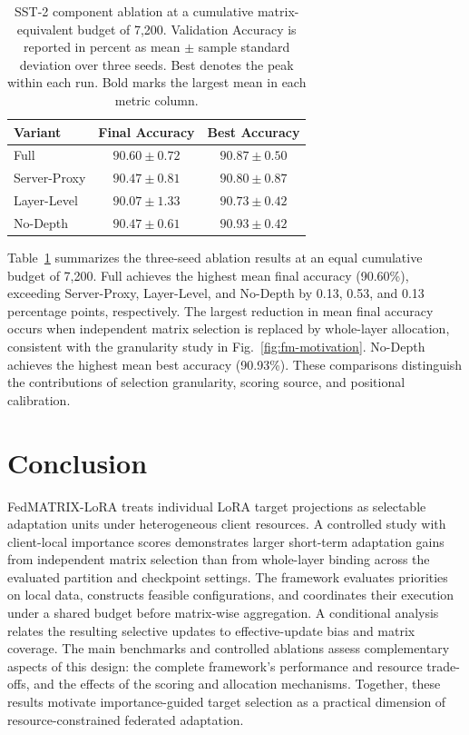 \documentclass[10pt,conference,letterpaper]{IEEEtran}
\begin{document}
\begin{table}[t]
\centering
\caption{SST-2 component ablation at a cumulative matrix-equivalent budget of 7,200. Validation Accuracy is reported in percent as mean $\pm$ sample standard deviation over three seeds. Best denotes the peak within each run. Bold marks the largest mean in each metric column.}
\label{tab:fm-ablations}
\small
\setlength{\tabcolsep}{4pt}
\begin{tabular}{@{}lcc@{}}
\toprule
Variant & Final Accuracy & Best Accuracy \\
\midrule
Full & $\mathbf{90.60}\pm0.72$ & $90.87\pm0.50$ \\
Server-Proxy & $90.47\pm0.81$ & $90.80\pm0.87$ \\
Layer-Level & $90.07\pm1.33$ & $90.73\pm0.42$ \\
No-Depth & $90.47\pm0.61$ & $\mathbf{90.93}\pm0.42$ \\
\bottomrule
\end{tabular}
\end{table}

Table~\ref{tab:fm-ablations} summarizes the three-seed ablation results at an equal cumulative budget of 7,200. Full achieves the highest mean final accuracy (90.60\%), exceeding Server-Proxy, Layer-Level, and No-Depth by 0.13, 0.53, and 0.13 percentage points, respectively. The largest reduction in mean final accuracy occurs when independent matrix selection is replaced by whole-layer allocation, consistent with the granularity study in Fig.~\ref{fig:fm-motivation}. No-Depth achieves the highest mean best accuracy (90.93\%). These comparisons distinguish the contributions of selection granularity, scoring source, and positional calibration.

\FloatBarrier
\section{Conclusion}\label{Sec.conclusion}
FedMATRIX-LoRA treats individual LoRA target projections as selectable adaptation units under heterogeneous client resources. A controlled study with client-local importance scores demonstrates larger short-term adaptation gains from independent matrix selection than from whole-layer binding across the evaluated partition and checkpoint settings. The framework evaluates priorities on local data, constructs feasible configurations, and coordinates their execution under a shared budget before matrix-wise aggregation. A conditional analysis relates the resulting selective updates to effective-update bias and matrix coverage. The main benchmarks and controlled ablations assess complementary aspects of this design: the complete framework's performance and resource trade-offs, and the effects of the scoring and allocation mechanisms. Together, these results motivate importance-guided target selection as a practical dimension of resource-constrained federated adaptation.
\end{document}
